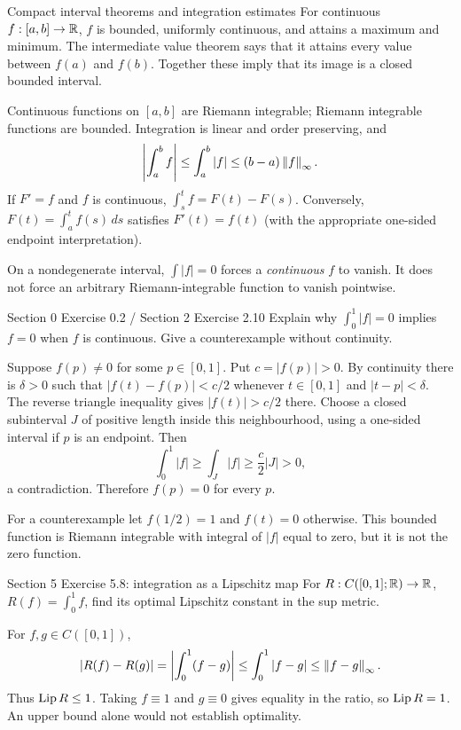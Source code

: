 \begin{note}{Compact interval theorems and integration estimates}
For continuous $f:[a,b]\to\mathbb R$, $f$ is bounded, uniformly continuous, and attains a maximum and minimum. The intermediate value theorem says that it attains every value between $f(a)$ and $f(b)$. Together these imply that its image is a closed bounded interval.

Continuous functions on $[a,b]$ are Riemann integrable; Riemann integrable functions are bounded. Integration is linear and order preserving, and
\[\left|\int_a^bf\right|\le\int_a^b|f|\le(b-a)\left\lVert f\right\rVert_\infty.\]
If $F'=f$ and $f$ is continuous, $\int_s^tf=F(t)-F(s)$. Conversely, $F(t)=\int_a^tf(s)\,ds$ satisfies $F'(t)=f(t)$ (with the appropriate one-sided endpoint interpretation).

On a nondegenerate interval, $\int|f|=0$ forces a \emph{continuous} $f$ to vanish. It does not force an arbitrary Riemann-integrable function to vanish pointwise.
\end{note}
\begin{exam}{Section 0 Exercise 0.2 / Section 2 Exercise 2.10}
Explain why $\int_0^1|f|=0$ implies $f=0$ when $f$ is continuous. Give a counterexample without continuity.
\end{exam}
\begin{answer}
Suppose $f(p)\ne0$ for some $p\in[0,1]$. Put $c=|f(p)|>0$. By continuity there is $\delta>0$ such that $|f(t)-f(p)|<c/2$ whenever $t\in[0,1]$ and $|t-p|<\delta$. The reverse triangle inequality gives $|f(t)|>c/2$ there. Choose a closed subinterval $J$ of positive length inside this neighbourhood, using a one-sided interval if $p$ is an endpoint. Then
\[\int_0^1|f|\ge\int_J|f|\ge\frac c2|J|>0,\]
a contradiction. Therefore $f(p)=0$ for every $p$.

For a counterexample let $f(1/2)=1$ and $f(t)=0$ otherwise. This bounded function is Riemann integrable with integral of $|f|$ equal to zero, but it is not the zero function.
\end{answer}
\begin{exam}{Section 5 Exercise 5.8: integration as a Lipschitz map}
For $R:C([0,1];\mathbb R)\to\mathbb R$, $R(f)=\int_0^1f$, find its optimal Lipschitz constant in the sup metric.
\end{exam}
\begin{answer}
For $f,g\in C([0,1])$,
\[|R(f)-R(g)|=\left|\int_0^1(f-g)\right|\le\int_0^1|f-g|\le\left\lVert f-g\right\rVert_\infty.\]
Thus $\operatorname{Lip} R\le1$. Taking $f\equiv1$ and $g\equiv0$ gives equality in the ratio, so $\operatorname{Lip} R=1$. An upper bound alone would not establish optimality.
\end{answer}


